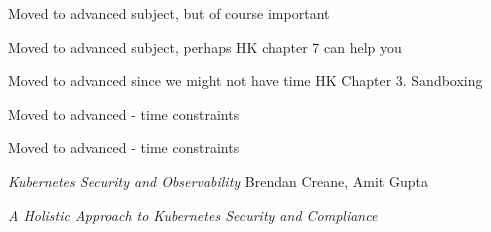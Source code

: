 \documentclass[Screen16to9,17pt]{foils}
\begin{document}

Moved to advanced subject, but of course important


Moved to advanced subject, perhaps HK chapter 7 can help you


Moved to advanced since we might not have time
HK Chapter 3. Sandboxing

Moved to advanced - time constraints

Moved to advanced - time constraints




\begin{list2}


\item \emph{Kubernetes Security and Observability} Brendan Creane, Amit Gupta %

\end{list2}



\begin{list2}
\item
\item \emph{A Holistic Approach to Kubernetes Security and Compliance}\\
\end{list2}
\end{document}
